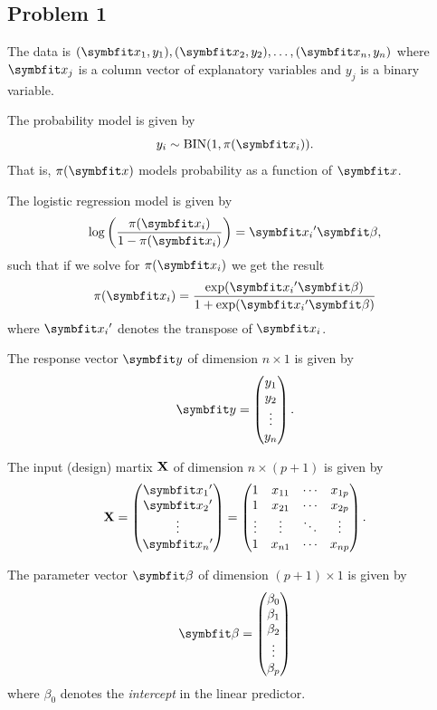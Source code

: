 \documentclass[
  11pt,
]{article}
\begin{document}
\hypertarget{problem-1}{%
\subsection{Problem 1}\label{problem-1}}


The data is \((\v{x_1},y_1),(\v{x_2},y_2),\ldots,(\v{x_n},y_n)\) where
\(\v{x_j}\) is a column vector of explanatory variables and \(y_j\) is a
binary variable.

The probability model is given by \[
  y_i \sim \operatorname{BIN}(1,\pi(\v{x_i})).
\] That is, \(\pi(\v{x})\) models probability as a function of
\(\v{x}\).

The logistic regression model is given by \[
  \log \left(\frac{\pi(\v{x_i})}{1-\pi(\v{x_i})}\right) = \v{x_i}' \v{\beta},
\] such that if we solve for \(\pi(\v{x_i})\) we get the result \[
  \pi(\v{x_i}) = \frac{\exp(\v{x_i}' \v{\beta})}{1+\exp(\v{x_i}' \v{\beta})}
\] where \(\v{x_i}'\) denotes the transpose of \(\v{x_i}\).

The response vector \(\v{y}\) of dimension \(n \times 1\) is given by \[
\v{y} =
\begin{pmatrix}
  y_1\\
  y_2\\
  \vdots\\
  y_n
\end{pmatrix}.
\]

The input (design) martix \(\mathbf{X}\) of dimension \(n \times (p+1)\) is
given by \[
\mat{X} =
\begin{pmatrix}
  \v{x_1}'\\
  \v{x_2}'\\
  \vdots\\
  \v{x_n}'
\end{pmatrix}
=
\begin{pmatrix}
  1 & x_{1 1} & \cdots & x_{1 p}\\
  1 & x_{2 1} & \cdots & x_{2 p}\\
  \vdots  & \vdots & \ddots & \vdots\\
  1 & x_{n 1} & \cdots & x_{n p}
\end{pmatrix}.
\]

The parameter vector \(\v{\beta}\) of dimension \((p+1) \times 1\) is
given by \[
\v{\beta} =
\begin{pmatrix}
  \beta_0\\
  \beta_1\\
  \beta_2\\
  \vdots\\
  \beta_p
\end{pmatrix}
\] where \(\beta_0\) denotes the \emph{intercept} in the linear
predictor.
\end{document}
